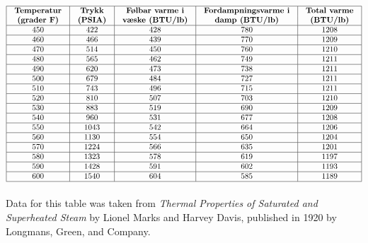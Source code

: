 $$\vbox{\offinterlineskip
\halign{\strut
\vrule \quad\hfil # \ \hfil & 
\vrule \quad\hfil # \ \hfil & 
\vrule \quad\hfil # \ \hfil & 
\vrule \quad\hfil # \ \hfil & 
\vrule \quad\hfil # \ \hfil \vrule \cr
\noalign{\hrule}
%
{\bf Temperatur} & {\bf Trykk} & {\bf Følbar varme i} & {\bf Fordampningsvarme i} & {\bf Total varme} \cr
{\bf (grader F)} & {\bf (PSIA)} & {\bf væske (BTU/lb)} & {\bf damp (BTU/lb)} & {\bf (BTU/lb)} \cr
%
\noalign{\hrule}
%
450 & 422 & 428 & 780 & 1208 \cr
%
\noalign{\hrule}
%
460 & 466 & 439 & 770 & 1209 \cr
%
\noalign{\hrule}
%
470 & 514 & 450 & 760 & 1210 \cr
%
\noalign{\hrule}
%
480 & 565 & 462 & 749 & 1211 \cr
%
\noalign{\hrule}
%
490 & 620 & 473 & 738 & 1211 \cr
%
\noalign{\hrule}
%
500 & 679 & 484 & 727 & 1211 \cr
%
\noalign{\hrule}
%
510 & 743 & 496 & 715 & 1211 \cr
%
\noalign{\hrule}
%
520 & 810 & 507 & 703 & 1210 \cr
%
\noalign{\hrule}
%
530 & 883 & 519 & 690 & 1209 \cr
%
\noalign{\hrule}
%
540 & 960 & 531 & 677 & 1208 \cr
%
\noalign{\hrule}
%
550 & 1043 & 542 & 664 & 1206 \cr
%
\noalign{\hrule}
%
560 & 1130 & 554 & 650 & 1204 \cr
%
\noalign{\hrule}
%
570 & 1224 & 566 & 635 & 1201 \cr
%
\noalign{\hrule}
%
580 & 1323 & 578 & 619 & 1197 \cr
%
\noalign{\hrule}
%
590 & 1428 & 591 & 602 & 1193 \cr
%
\noalign{\hrule}
%
600 & 1540 & 604 & 585 & 1189 \cr
%
\noalign{\hrule}
} %
}$$ %















Data for this table was taken from {\it Thermal Properties of Saturated and Superheated Steam} by Lionel Marks and Harvey Davis, published in 1920 by Longmans, Green, and Company. 



